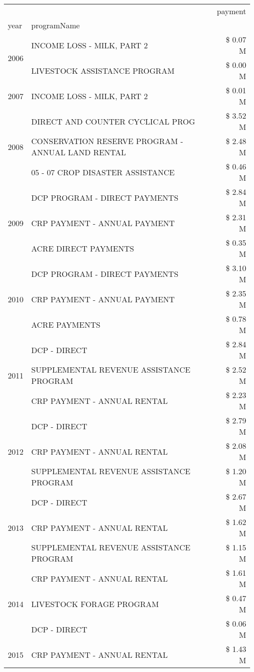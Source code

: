 \begin{tabular}{llr}
\toprule
 &  & payment \\
year & programName &  \\
\midrule
\multirow[t]{2}{*}{2006} & INCOME LOSS - MILK, PART 2 & \$ 0.07 M \\
 & LIVESTOCK ASSISTANCE PROGRAM & \$ 0.00 M \\
\cline{1-3}
2007 & INCOME LOSS - MILK, PART 2 & \$ 0.01 M \\
\cline{1-3}
\multirow[t]{3}{*}{2008} & DIRECT AND COUNTER CYCLICAL PROG & \$ 3.52 M \\
 & CONSERVATION RESERVE PROGRAM - ANNUAL LAND RENTAL & \$ 2.48 M \\
 & 05 - 07 CROP DISASTER ASSISTANCE & \$ 0.46 M \\
\cline{1-3}
\multirow[t]{3}{*}{2009} & DCP PROGRAM - DIRECT PAYMENTS & \$ 2.84 M \\
 & CRP PAYMENT - ANNUAL PAYMENT & \$ 2.31 M \\
 & ACRE DIRECT PAYMENTS & \$ 0.35 M \\
\cline{1-3}
\multirow[t]{3}{*}{2010} & DCP PROGRAM - DIRECT PAYMENTS & \$ 3.10 M \\
 & CRP PAYMENT - ANNUAL PAYMENT & \$ 2.35 M \\
 & ACRE PAYMENTS & \$ 0.78 M \\
\cline{1-3}
\multirow[t]{3}{*}{2011} & DCP - DIRECT & \$ 2.84 M \\
 & SUPPLEMENTAL REVENUE ASSISTANCE PROGRAM & \$ 2.52 M \\
 & CRP PAYMENT - ANNUAL RENTAL & \$ 2.23 M \\
\cline{1-3}
\multirow[t]{3}{*}{2012} & DCP - DIRECT & \$ 2.79 M \\
 & CRP PAYMENT - ANNUAL RENTAL & \$ 2.08 M \\
 & SUPPLEMENTAL REVENUE ASSISTANCE PROGRAM & \$ 1.20 M \\
\cline{1-3}
\multirow[t]{3}{*}{2013} & DCP - DIRECT & \$ 2.67 M \\
 & CRP PAYMENT - ANNUAL RENTAL & \$ 1.62 M \\
 & SUPPLEMENTAL REVENUE ASSISTANCE PROGRAM & \$ 1.15 M \\
\cline{1-3}
\multirow[t]{3}{*}{2014} & CRP PAYMENT - ANNUAL RENTAL & \$ 1.61 M \\
 & LIVESTOCK FORAGE PROGRAM & \$ 0.47 M \\
 & DCP - DIRECT & \$ 0.06 M \\
\cline{1-3}
\multirow[t]{3}{*}{2015} & CRP PAYMENT - ANNUAL RENTAL & \$ 1.43 M \\

\end{tabular}
